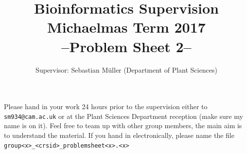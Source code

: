\documentclass[11pt,runningheads,a4paper]{article}
\begin{document}
\title{{\LARGE Bioinformatics Supervision}\\
{\Large Michaelmas Term 2017}\\
{\Large --Problem Sheet 2--}}

\author{Supervisor: Sebastian Müller (Department of Plant Sciences)}
\date{}

\maketitle

Please hand in your work 24 hours prior to the supervision either to \texttt{sm934@cam.ac.uk} or at the Plant Sciences Department reception (make sure my name is on it).
Feel free to team up with other group members, the main aim is to understand the material.
If you hand in electronically, please name the file \texttt{group<x>\_<crsid>\_problemsheet<x>.<x>}
\end{document}
